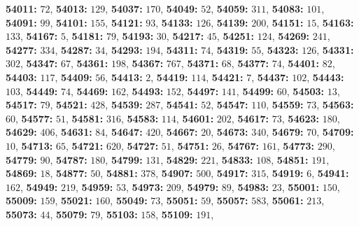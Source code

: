 \textsf{\bfseries 54011:} $72$, \textsf{\bfseries 54013:} $129$, \textsf{\bfseries 54037:} $170$, \textsf{\bfseries 54049:} $52$, \textsf{\bfseries 54059:} $311$, \textsf{\bfseries 54083:} $101$, \textsf{\bfseries 54091:} $99$, \textsf{\bfseries 54101:} $155$, \textsf{\bfseries 54121:} $93$, \textsf{\bfseries 54133:} $126$, \textsf{\bfseries 54139:} $200$, \textsf{\bfseries 54151:} $15$, \textsf{\bfseries 54163:} $133$, \textsf{\bfseries 54167:} $5$, \textsf{\bfseries 54181:} $79$, \textsf{\bfseries 54193:} $30$, \textsf{\bfseries 54217:} $45$, \textsf{\bfseries 54251:} $124$, \textsf{\bfseries 54269:} $241$, \textsf{\bfseries 54277:} $334$, \textsf{\bfseries 54287:} $34$, \textsf{\bfseries 54293:} $194$, \textsf{\bfseries 54311:} $74$, \textsf{\bfseries 54319:} $55$, \textsf{\bfseries 54323:} $126$, \textsf{\bfseries 54331:} $302$, \textsf{\bfseries 54347:} $67$, \textsf{\bfseries 54361:} $198$, \textsf{\bfseries 54367:} $767$, \textsf{\bfseries 54371:} $68$, \textsf{\bfseries 54377:} $74$, \textsf{\bfseries 54401:} $82$, \textsf{\bfseries 54403:} $117$, \textsf{\bfseries 54409:} $56$, \textsf{\bfseries 54413:} $2$, \textsf{\bfseries 54419:} $114$, \textsf{\bfseries 54421:} $7$, \textsf{\bfseries 54437:} $102$, \textsf{\bfseries 54443:} $103$, \textsf{\bfseries 54449:} $74$, \textsf{\bfseries 54469:} $162$, \textsf{\bfseries 54493:} $152$, \textsf{\bfseries 54497:} $141$, \textsf{\bfseries 54499:} $60$, \textsf{\bfseries 54503:} $13$, \textsf{\bfseries 54517:} $79$, \textsf{\bfseries 54521:} $428$, \textsf{\bfseries 54539:} $287$, \textsf{\bfseries 54541:} $52$, \textsf{\bfseries 54547:} $110$, \textsf{\bfseries 54559:} $73$, \textsf{\bfseries 54563:} $60$, \textsf{\bfseries 54577:} $51$, \textsf{\bfseries 54581:} $316$, \textsf{\bfseries 54583:} $114$, \textsf{\bfseries 54601:} $202$, \textsf{\bfseries 54617:} $73$, \textsf{\bfseries 54623:} $180$, \textsf{\bfseries 54629:} $406$, \textsf{\bfseries 54631:} $84$, \textsf{\bfseries 54647:} $420$, \textsf{\bfseries 54667:} $20$, \textsf{\bfseries 54673:} $340$, \textsf{\bfseries 54679:} $70$, \textsf{\bfseries 54709:} $10$, \textsf{\bfseries 54713:} $65$, \textsf{\bfseries 54721:} $620$, \textsf{\bfseries 54727:} $51$, \textsf{\bfseries 54751:} $26$, \textsf{\bfseries 54767:} $161$, \textsf{\bfseries 54773:} $290$, \textsf{\bfseries 54779:} $90$, \textsf{\bfseries 54787:} $180$, \textsf{\bfseries 54799:} $131$, \textsf{\bfseries 54829:} $221$, \textsf{\bfseries 54833:} $108$, \textsf{\bfseries 54851:} $191$, \textsf{\bfseries 54869:} $18$, \textsf{\bfseries 54877:} $50$, \textsf{\bfseries 54881:} $378$, \textsf{\bfseries 54907:} $500$, \textsf{\bfseries 54917:} $315$, \textsf{\bfseries 54919:} $6$, \textsf{\bfseries 54941:} $162$, \textsf{\bfseries 54949:} $219$, \textsf{\bfseries 54959:} $53$, \textsf{\bfseries 54973:} $209$, \textsf{\bfseries 54979:} $89$, \textsf{\bfseries 54983:} $23$, \textsf{\bfseries 55001:} $150$, \textsf{\bfseries 55009:} $159$, \textsf{\bfseries 55021:} $160$, \textsf{\bfseries 55049:} $73$, \textsf{\bfseries 55051:} $59$, \textsf{\bfseries 55057:} $583$, \textsf{\bfseries 55061:} $213$, \textsf{\bfseries 55073:} $44$, \textsf{\bfseries 55079:} $79$, \textsf{\bfseries 55103:} $158$, \textsf{\bfseries 55109:} $191$, 
